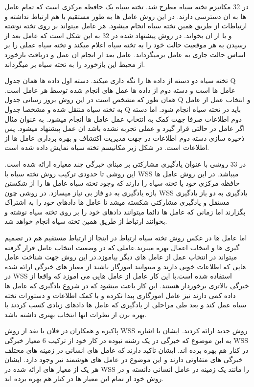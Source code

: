 در 32 مکانیزم تخته سیاه مطرح شد. تخته سیاه یک حافظه مرکزی است که تمام عامل ها به ان دسترسی دارند. در این روش عامل ها به طور مستقیم با هم ارتباط نداشته و ارتباطات از طریق همین تخته سیاه انجام میشود. هر عامل میتواند بر روی تخته نوشته و یا از ان بخواند.
در روش پیشنهاد شده در 32 به این شکل است که عامل بعد از رسیدن به هر موقعیت حالت خود را به تخته سیاه اعلام میکند و تخته سیاه عملی را بر اساس حالت جاری به عامل برمیگرداند. عامل بعد از انجام ان عمل و دریافت بازخورد از محیط این بازخورد را به تخته سیاه بر میگرداند.

تخته سیاه دو دسته از داده ها را نگه داری میکند. دسته اول داده ها همان جدول Q عامل ها است و دسته دوم از داده ها عمل های انجام شده توسط هر عامل است. همان طور که مشخص است در این روش بروز رسانی جدول Q و انتخاب عمل از عامل به تخته سیاه منتقل شده و مشخصا جدول Q باید در تخته سیاه انجام شود. اما دسته دوم اطلاعات صرفا جهت کمک به انتخاب عمل عامل ها انجام میشود. به عنوان مثال اگر عامل در حالتی قرار گیرد و عملی تجربه نشده باشد ان عمل پیشنهاد میشود. پس ذخیره سازی دسته دوم اطلاعات در جهت مدیریت اکتشاف و بهره برداری عامل ها از اطلاعات است. در شکل زیر مکانیسم تخته سیاه نمایش داده شده است.

در 33 روشی با عنوان یادگیری مشارکتی بر مبنای خبرگی چند معیاره ارائه شده است. این روشی تا حدودی ترکیب روش تخته سیاه با WSS میباشد. در این روش عامل ها حافظه مرکزی خود یا تخته سیاه را دارند که وجود تخته سیاه عامل ها را از شکستن بازه یادگیری به دو فاز بی نیاز میسازد. در روشی چون WSS یادگیری به دو باز یادگیری مستقل و یادگیری مشارکتی شکسته میشد تا عامل ها دادهای خود را به اشتراک بگزارند اما زمانی که عامل ها دائما میتوانند دادهای خود را بر روی تخته سیاه نوشته و بخوانند ارتباط از طریق همین تخته سیاه انجام خواهد شد.

اما عامل ها در عکس روش تخته سیاه ارتباط در اینجا از ارتباط مستقیم هم در تصمیم گیری ها و انتخاب اعمال بهره میبرند.عاملی که در وضعیت انتخاب عامل قرار گرفته میتواند در انتخاب عمل از عامل های دیگر بیاموزد.در این روش جهت شناخت عامل هایی که اطلاعات خوبی دارند و میتوانند اموزگار باشند از معیار های خبرگی ارائه شده در WSS استفاده شده است.با این کار عامل از عامل هایی می اموزد که واقعا از خبرگی بالاتری برخوردار هستند. این کار باعث میشود که در شروع یادگیری که عامل ها داده کمی دارند نیز عامل اموزگاری پیدا نکرده و با کمک اطلاعات و دستورات تخته سیاه عمل کند و بعد طی مراحلی از یادگیری که عامل ها دادهای زیادی کسب کردند  با بهره برن از نظرات انها انتخاب بهتری داشته باشد.

پاکیزه و همکاران در فلان با نقد از روش WSS روش جدید ارائه کردند. ایشان با اشاره به این موضوع که خبرگی در یک رشته نبوده در کار خود از ترکیب 6 معیار خبرگی WSS در کنار هم بهره برده اند. ایشان تاکید دارند که عامل های انسانی در زمینه های مختلف خبرگی های متفاوتی دارند و این موضوع در عامل های هوشمند نیز وجود دارد. ایشان هر یک از معیار های ارائه شده در WSS را مانند یک زمینه در عامل انسانی دانسته و در روش خود از تمام این معیار ها در کنار هم بهره برده اند.

